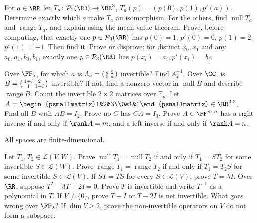 \documentclass[11pt]{scrartcl}
\DeclareMathOperator{\nul}{null}
\DeclareMathOperator{\range}{range}
\newcommand{\LL}{\mathcal L}
\newcommand{\PP}{\mathcal P}
\newcommand{\Fp}{\mathbb F_p}
\begin{document}
\begin{problem}
  \leavevmode
  \begin{enumerate}[(a)]
    \ii For $a\in\RR$ let $T_a\colon\PP_2(\RR)\to\RR^3$, $T_a(p)=(p(0),p(1),p'(a))$.
    Determine exactly which $a$ make $T_a$ an isomorphism.
    For the others, find $\nul T_a$ and $\range T_a$, and explain using the mean value theorem.
    \ii Prove, before computing, that exactly one $p\in\PP_3(\RR)$ has
    $p(0)=1$, $p'(0)=0$, $p(1)=2$, $p'(1)=-1$. Then find it.
    \ii Prove or disprove: for distinct $x_0,x_1$ and any $a_0,a_1,b_0,b_1$, exactly one $p\in\PP_3(\RR)$ has $p(x_i)=a_i$, $p'(x_i)=b_i$.
  \end{enumerate}
\end{problem}

\begin{problem}
  \leavevmode
  \begin{enumerate}[(a)]
    \ii Over $\FF_5$, for which $a$ is $A_a=\begin{psmallmatrix}a&2\\3&a\end{psmallmatrix}$ invertible?
    Find $A_2^{-1}$.
    \ii Over $\CC$, is $B=\begin{psmallmatrix}1+i&2\\1&1-i\end{psmallmatrix}$ invertible?
    If not, find a nonzero vector in $\nul B$ and describe $\range B$.
    \ii Count the invertible $2\times2$ matrices over $\Fp$.
    \ii Let $A=\begin{psmallmatrix}1&2&3\\0&1&1\end{psmallmatrix}\in\RR^{2,3}$.
    Find all $B$ with $AB=I_2$. Prove no $C$ has $CA=I_3$.
    \ii Prove $A\in\FF^{m,n}$ has a right inverse if and only if $\rank A=m$, and a left inverse if and only if $\rank A=n$.
  \end{enumerate}
\end{problem}

\begin{problem}
  All spaces are finite-dimensional.
  \begin{enumerate}[(a)]
    \ii Let $T_1,T_2\in\LL(V,W)$.
    Prove $\nul T_1=\nul T_2$ if and only if $T_1=ST_2$ for some invertible $S\in\LL(W)$.
    \ii Prove $\range T_1=\range T_2$ if and only if $T_1=T_2S$ for some invertible $S\in\LL(V)$.
    \ii If $ST=TS$ for every $S\in\LL(V)$, prove $T=\lambda I$.
    \ii Over $\RR$, suppose $T^2-3T+2I=0$.
    Prove $T$ is invertible and write $T^{-1}$ as a polynomial in $T$.
    If $V\ne\{0\}$, prove $T-I$ or $T-2I$ is not invertible.
    What goes wrong over $\FF_2$?
    \ii If $\dim V\ge2$, prove the non-invertible operators on $V$ do not form a subspace.
  \end{enumerate}
\end{problem}
\end{document}
